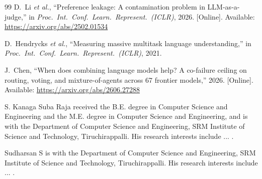 \documentclass{ieeeaccess}
\theoremstyle{definition}
\theoremstyle{plain}
\begin{document}
\begin{thebibliography}{99}
 D.~Li \emph{et al.}, ``Preference leakage: A contamination
problem in LLM-as-a-judge,'' in \emph{Proc.\ Int.\ Conf.\ Learn.\ Represent.\
(ICLR)}, 2026. [Online]. Available: \url{https://arxiv.org/abs/2502.01534}

 D.~Hendrycks \emph{et al.}, ``Measuring massive multitask
language understanding,'' in \emph{Proc.\ Int.\ Conf.\ Learn.\ Represent.\
(ICLR)}, 2021.

 J.~Chen, ``When does combining language models help? A
co-failure ceiling on routing, voting, and mixture-of-agents across 67 frontier
models,'' 2026. [Online]. Available: \url{https://arxiv.org/abs/2606.27288}

\end{thebibliography}

\begin{IEEEbiographynophoto}{S. Kanaga Suba Raja}%
received the B.E. degree in Computer Science and Engineering and the M.E. degree
in Computer Science and Engineering, and is with the Department of Computer
Science and Engineering, SRM Institute of Science and Technology, Tiruchirappalli.
His research interests include ... . %
\end{IEEEbiographynophoto}

\begin{IEEEbiographynophoto}{Sudharsan S}%
is with the Department of Computer Science and Engineering, SRM Institute of
Science and Technology, Tiruchirappalli. His research interests include ... . %
\end{IEEEbiographynophoto}

\EOD
\end{document}
